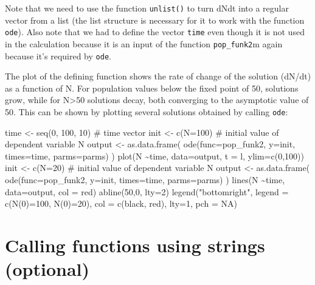 \documentclass[
  letterpaper,
  DIV=11,
  numbers=noendperiod]{scrreprt}
\newenvironment{Shaded}{\begin{snugshade}}{\end{snugshade}}
\newcommand{\NormalTok}[1]{\textcolor[rgb]{0.00,0.23,0.31}{#1}}
\begin{document}
Note that we need to use the function \texttt{unlist()} to turn dNdt
into a regular vector from a list (the list structure is necessary for
it to work with the function \texttt{ode}). Also note that we had to
define the vector \texttt{time} even though it is not used in the
calculation because it is an input of the function \texttt{pop\_funk2}m
again because it's required by \texttt{ode}.

The plot of the defining function shows the rate of change of the
solution (dN/dt) as a function of N. For population values below the
fixed point of 50, solutions grow, while for N\textgreater50 solutions
decay, both converging to the asymptotic value of 50. This can be shown
by plotting several solutions obtained by calling \texttt{ode}:

\begin{Shaded}
\begin{Highlighting}[]
\NormalTok{time \textless{}{-} seq(0, 100, 10) \# time vector}
\NormalTok{init \textless{}{-} c(N=100) \# initial value of dependent variable N}
\NormalTok{output \textless{}{-} as.data.frame(}
\NormalTok{  ode(func=pop\_funk2, y=init, times=time, parms=parms)}
\NormalTok{  )}
\NormalTok{plot(N \textasciitilde{}time, data=output, t = \textquotesingle{}l\textquotesingle{}, ylim=c(0,100))}
\NormalTok{init \textless{}{-} c(N=20) \# initial value of dependent variable N}
\NormalTok{output \textless{}{-} as.data.frame(}
\NormalTok{  ode(func=pop\_funk2, y=init, times=time, parms=parms)}
\NormalTok{  )}
\NormalTok{lines(N \textasciitilde{}time, data=output, col = \textquotesingle{}red\textquotesingle{})}
\NormalTok{abline(50,0, lty=2)}
\NormalTok{legend("bottomright", legend = c(\textquotesingle{}N(0)=100\textquotesingle{}, \textquotesingle{}N(0)=20\textquotesingle{}), col = c(\textquotesingle{}black\textquotesingle{}, \textquotesingle{}red\textquotesingle{}), lty=1, pch = NA)}
\end{Highlighting}
\end{Shaded}

\hypertarget{calling-functions-using-strings-optional}{%
\section*{Calling functions using strings
(optional)}\label{calling-functions-using-strings-optional}}

\end{document}
